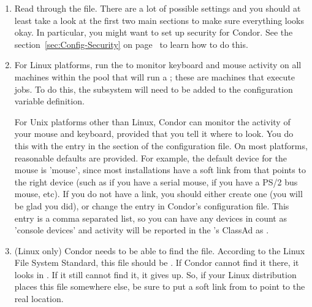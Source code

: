\begin{enumerate}
\item Read through the  file.  There are a
    lot of possible settings and you should at least take a look at
    the first two main sections to make sure everything looks okay.
    In particular, you might want to set up security for
    Condor.  See the section~\ref{sec:Config-Security} on
    page~\pageref{sec:Config-Security} to learn how to do this.

\item For Linux platforms, run the  to monitor keyboard
    and mouse activity on all machines within the pool that will
    run a ; these are machines that execute jobs.
    To do this, the subsystem  will need to be added to
    the  configuration variable definition.

    For Unix platforms other than Linux,
    Condor can monitor the activity of your mouse and keyboard,
    provided that you tell it where to look.  You do this with the
     entry in the  section of
    the configuration file.  On most platforms, reasonable
    defaults are provided.
    For example, the default device for the mouse
    is 'mouse', since most installations have a soft link from
     that points to the right device (such as
     if you have a serial mouse,  if you have
    a PS/2 bus mouse, etc).  If you do not have a 
    link, you should either create one (you will be glad you did), or
    change the  entry in Condor's
    configuration file.
    This entry is a comma separated list, so you can have any
    devices in  count as 'console devices' and activity
    will be reported in the 's ClassAd as
    .

\item  (Linux only) Condor needs to be able to find the  file.
    According to the Linux File System Standard, this file should be
    .  If Condor cannot find it there, it looks in
    .  If it still cannot find it, it gives up.  So, if
    your Linux distribution places this file somewhere else, be sure to
    put a soft link from  to point to the real location.

\end{enumerate}

